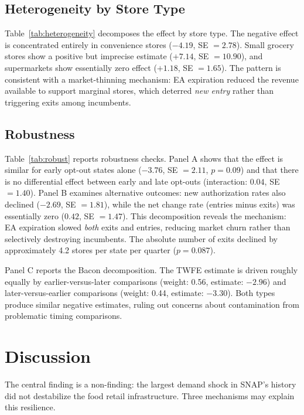 \documentclass[12pt]{article}
\begin{document}
\subsection{Heterogeneity by Store Type}



Table~\ref{tab:heterogeneity} decomposes the effect by store type. The negative effect is concentrated entirely in convenience stores ($-4.19$, SE $= 2.78$). Small grocery stores show a positive but imprecise estimate ($+7.14$, SE $= 10.90$), and supermarkets show essentially zero effect ($+1.18$, SE $= 1.65$). The pattern is consistent with a market-thinning mechanism: EA expiration reduced the revenue available to support marginal stores, which deterred \textit{new entry} rather than triggering exits among incumbents.

\subsection{Robustness}



Table~\ref{tab:robust} reports robustness checks. Panel A shows that the effect is similar for early opt-out states alone ($-3.76$, SE $= 2.11$, $p = 0.09$) and that there is no differential effect between early and late opt-outs (interaction: $0.04$, SE $= 1.40$). Panel B examines alternative outcomes: new authorization rates also declined ($-2.69$, SE $= 1.81$), while the net change rate (entries minus exits) was essentially zero ($0.42$, SE $= 1.47$). This decomposition reveals the mechanism: EA expiration slowed \textit{both} exits and entries, reducing market churn rather than selectively destroying incumbents. The absolute number of exits declined by approximately 4.2 stores per state per quarter ($p = 0.087$).

Panel C reports the Bacon decomposition. The TWFE estimate is driven roughly equally by earlier-versus-later comparisons (weight: 0.56, estimate: $-2.96$) and later-versus-earlier comparisons (weight: 0.44, estimate: $-3.30$). Both types produce similar negative estimates, ruling out concerns about contamination from problematic timing comparisons.

\section{Discussion}

The central finding is a non-finding: the largest demand shock in SNAP's history did not destabilize the food retail infrastructure. Three mechanisms may explain this resilience.
\end{document}
